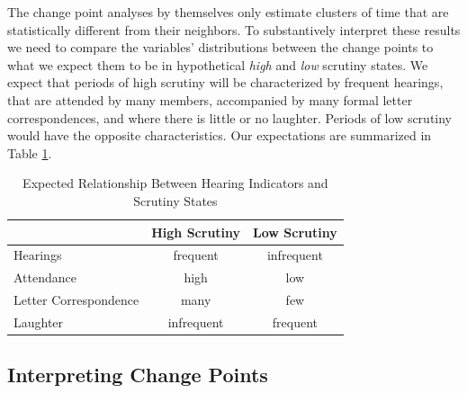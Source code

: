 \documentclass[a4paper]{article}\usepackage[]{graphicx}\usepackage[]{color}
\begin{document}
The change point analyses by themselves only estimate clusters of time that are statistically different from their neighbors. To substantively interpret these results we need to compare the variables' distributions between the change points to what we expect them to be in hypothetical \emph{high} and \emph{low} scrutiny states. We expect that periods of high scrutiny will be characterized by frequent hearings, that are attended by many members, accompanied by many formal letter correspondences, and where there is little or no laughter. Periods of low scrutiny would have the opposite characteristics. Our expectations are summarized in Table \ref{ExpectedTable}.

\begin{table}
    \caption{Expected Relationship Between Hearing Indicators and Scrutiny States}
    \label{ExpectedTable}
    \begin{center}
        \begin{tabular}{l | c c}
            \hline
            & High Scrutiny & Low Scrutiny \\
            \hline \hline
            Hearings & frequent & infrequent \\[0.25cm]
            Attendance & high & low \\[0.25cm]
            Letter Correspondence & many & few \\[0.25cm]
            Laughter & infrequent & frequent \\
            \hline
        \end{tabular}
    \end{center}
\end{table}

\subsection{Interpreting Change Points}
\end{document}
